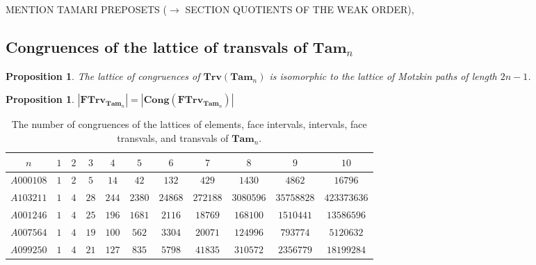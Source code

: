 \documentclass[leqno, 12pt]{amsart}
\numberwithin{equation}{section}
\newcommand{\Tam}{\mathbf{Tam}}
\renewcommand{\L}{\mathbf L}
\newcommand{\Cong}{\mathbf{Cong}}
\newcommand{\Fac}{\mathbf{FInt}}
\newcommand{\Trf}{\mathbf{FTrv}}
\newcommand{\Int}{\mathbf{Int}}
\newcommand{\Trv}{\mathbf{Trv}}
\numberwithin{equation}{section}
\newtheorem{prop}[thm]{Proposition}
\theoremstyle{remark}
\begin{document}
	
	MENTION TAMARI PREPOSETS ($\to$ SECTION QUOTIENTS OF THE WEAK ORDER),
	
	\subsection{Congruences of the lattice of transvals of $\Tam_n$}
	
	\begin{prop}
		The lattice of congruences of $\Trv(\Tam_n)$ is isomorphic to the lattice of Motzkin paths of length $2n-1$.
	\end{prop}
	
	\begin{prop}
	     $|\Trf_{\Tam_n}|=|\Cong(\Trf_{\Tam_n})|$
	\end{prop}
	
	\begin{table}[H]
		\centering
		\begin{tabular}{ccccccccccc}
		\toprule
		   $n$ & $1$& $2$ &$3$ & $4$ & $5$ & $6$ & $7$ & $8$ & $9$ & $10$  \\ \midrule 
		 $A000108$ & $1$ & $2$ & $5$ & $14$ & $42$ & $132$ & $429$ & $1430$ & $4862$ & $16796$  \\  \midrule 
				$A103211$ & $1$ & $4$ & $28$ & $244$ & $2380$ & $24868$ & $272188$ & $3080596$ & $35758828$ & $423373636$ \\ \midrule
		$A001246$  & $1$ & $4$ & $25$ & $196$ & $1681$ & $2116$ & $18769$ & $168100$ &$1510441$ & $13586596$  \\ \midrule 
		
	    $A007564$ & $1$ & $4$ & $19$ & $100$ & $562$ & $3304$ & $20071$ & $124996$ & $793774$ & $5120632$  \\ \midrule 
        $A099250$	 & $1$ & $4$ & $21$ & $127$ & $835$ & $5798$ & $41835$ & $310572$ & $2356779$ & $18199284$ \\ \bottomrule
		\end{tabular}
		\caption{\centering The number of congruences of the lattices of elements, face intervals, intervals, face transvals, and transvals of $\Tam_n$.}
	\end{table}
	
%
\end{document}
